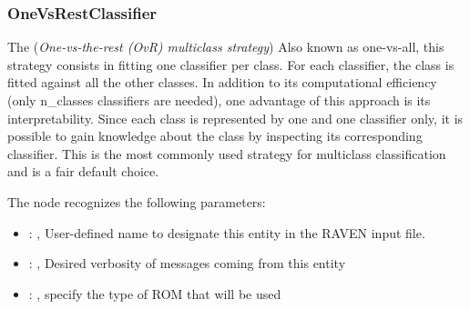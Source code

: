 \subsubsection{OneVsRestClassifier}
  The  (\textit{One-vs-the-rest (OvR) multiclass strategy})
  Also known as one-vs-all, this strategy consists in fitting one classifier per class. For each
  classifier, the class is fitted against all the other classes. In addition to its computational
  efficiency (only n\_classes classifiers are needed), one advantage of this approach is its
  interpretability. Since each class is represented by one and one classifier only, it is
  possible to gain knowledge about the class by inspecting its corresponding classifier.
  This is the most commonly used strategy for multiclass classification and is a fair default
  choice.                         

  The  node recognizes the following parameters:
    \begin{itemize}
      \item {}: , 
        User-defined name to designate this entity in the RAVEN input file.
      \item {}: , 
        Desired verbosity of messages coming from this entity
      \item {}: , 
        specify the type of ROM that will be used
  \end{itemize}


